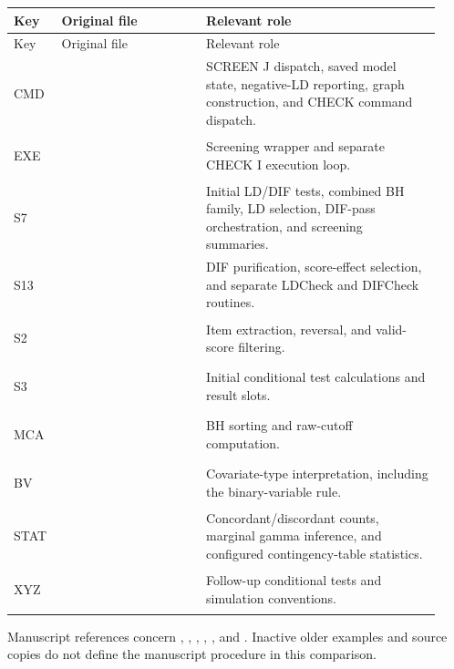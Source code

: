 \documentclass[11pt,a4paper]{article}
\begin{document}
\begin{longtable}{@{}L{0.09\linewidth}L{0.32\linewidth}L{0.52\linewidth}@{}}
\toprule
Key & Original file & Relevant role\\
\midrule
\endfirsthead
\toprule
Key & Original file & Relevant role\\
\midrule
\endhead
\bottomrule
\endfoot
\hypertarget{source-CMD}{CMD} &  &
SCREEN J dispatch, saved model state, negative-LD reporting,
graph construction, and CHECK command dispatch.\\
\hypertarget{source-EXE}{EXE} &  &
Screening wrapper and separate CHECK I execution loop.\\
\hypertarget{source-S7}{S7} &  &
Initial LD/DIF tests, combined BH family, LD selection,
DIF-pass orchestration, and screening summaries.\\
\hypertarget{source-S13}{S13} &  &
DIF purification, score-effect selection, and separate LDCheck
and DIFCheck routines.\\
\hypertarget{source-S2}{S2} &  &
Item extraction, reversal, and valid-score filtering.\\
\hypertarget{source-S3}{S3} &  &
Initial conditional test calculations and result slots.\\
\hypertarget{source-MCA}{MCA} &  &
BH sorting and raw-cutoff computation.\\
\hypertarget{source-BV}{BV} &  &
Covariate-type interpretation, including the binary-variable rule.\\
\hypertarget{source-STAT}{STAT} &  &
Concordant/discordant counts, marginal gamma inference,
and configured contingency-table statistics.\\
\hypertarget{source-XYZ}{XYZ} &  &
Follow-up conditional tests and simulation conventions.\\
\end{longtable}

Manuscript references concern ,
,
,
,
, and
.
Inactive older examples and source copies do not define the manuscript
procedure in this comparison.
\end{document}
